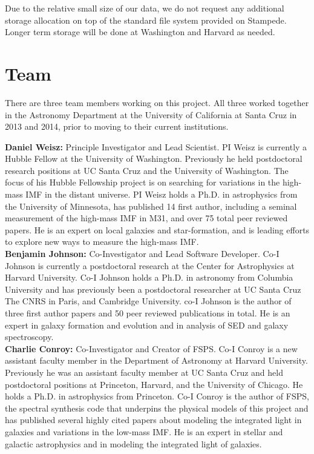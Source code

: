 \documentclass[11pt,preprint]{aastex}
\begin{document}
Due to the relative small size of our data, we do not request any additional storage allocation on top of the standard file system provided on Stampede.  Longer term storage will be done at Washington and Harvard as needed.








\section{Team}

There are three team members working on this project.  All three worked together in the Astronomy Department at the University of California at Santa Cruz in 2013 and 2014, prior to moving to their current institutions.

\textbf{Daniel Weisz:}  Principle Investigator and Lead Scientist.  PI Weisz is currently a Hubble Fellow at the University of Washington.  Previously he held postdoctoral research positions at UC Santa Cruz and the University of Washington.  The focus of his Hubble Fellowship project is on searching for variations in the high-mass IMF in the distant universe.  PI Weisz holds a Ph.D. in astrophysics from the University of Minnesota, has published 14 first author, including a seminal measurement of the high-mass IMF in M31, and over 75 total peer reviewed papers. He is an expert on local galaxies and star-formation, and is leading efforts to explore new ways to measure the high-mass IMF.  \\

\textbf{Benjamin Johnson:} Co-Investigator and Lead Software Developer.  Co-I Johnson is currently a postdoctoral research at the Center for Astrophysics at Harvard University.  Co-I Johnson holds a Ph.D. in astronomy from Columbia University and has previously been a postdoctoral researcher at UC Santa Cruz The CNRS in Paris, and Cambridge University.  co-I Johnson is the author of three first author papers and 50 peer reviewed publications in total.  He is an expert in galaxy formation and evolution and in analysis of SED and galaxy spectroscopy.  \\

\textbf{Charlie Conroy:}  Co-Investigator and Creator of FSPS.  Co-I Conroy is a new assistant faculty member in the Department of Astronomy at Harvard University.  Previously he was an assistant faculty member at UC Santa Cruz and held postdoctoral positions at Princeton, Harvard, and the University of Chicago.  He holds a Ph.D. in astrophysics from Princeton.  Co-I Conroy is the author of FSPS, the spectral synthesis code that underpins the physical models of this project and has published several highly cited papers about modeling the integrated light in galaxies and variations in the low-mass IMF.  He is an expert in stellar and galactic astrophysics and in modeling the integrated light of galaxies. \\





\end{document}
